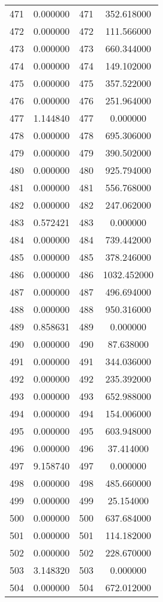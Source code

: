 \documentclass[12pt]{article}
\begin{document}
\begin{longtable}{@{}cccc@{}}
471 & 0.000000 & 471 & 352.618000 \\
472 & 0.000000 & 472 & 111.566000 \\
473 & 0.000000 & 473 & 660.344000 \\
474 & 0.000000 & 474 & 149.102000 \\
475 & 0.000000 & 475 & 357.522000 \\
476 & 0.000000 & 476 & 251.964000 \\
477 & 1.144840 & 477 & 0.000000 \\
478 & 0.000000 & 478 & 695.306000 \\
479 & 0.000000 & 479 & 390.502000 \\
480 & 0.000000 & 480 & 925.794000 \\
481 & 0.000000 & 481 & 556.768000 \\
482 & 0.000000 & 482 & 247.062000 \\
483 & 0.572421 & 483 & 0.000000 \\
484 & 0.000000 & 484 & 739.442000 \\
485 & 0.000000 & 485 & 378.246000 \\
486 & 0.000000 & 486 & 1032.452000 \\
487 & 0.000000 & 487 & 496.694000 \\
488 & 0.000000 & 488 & 950.316000 \\
489 & 0.858631 & 489 & 0.000000 \\
490 & 0.000000 & 490 & 87.638000 \\
491 & 0.000000 & 491 & 344.036000 \\
492 & 0.000000 & 492 & 235.392000 \\
493 & 0.000000 & 493 & 652.988000 \\
494 & 0.000000 & 494 & 154.006000 \\
495 & 0.000000 & 495 & 603.948000 \\
496 & 0.000000 & 496 & 37.414000 \\
497 & 9.158740 & 497 & 0.000000 \\
498 & 0.000000 & 498 & 485.660000 \\
499 & 0.000000 & 499 & 25.154000 \\
500 & 0.000000 & 500 & 637.684000 \\
501 & 0.000000 & 501 & 114.182000 \\
502 & 0.000000 & 502 & 228.670000 \\
503 & 3.148320 & 503 & 0.000000 \\
504 & 0.000000 & 504 & 672.012000 \\

\end{longtable}
\end{document}
